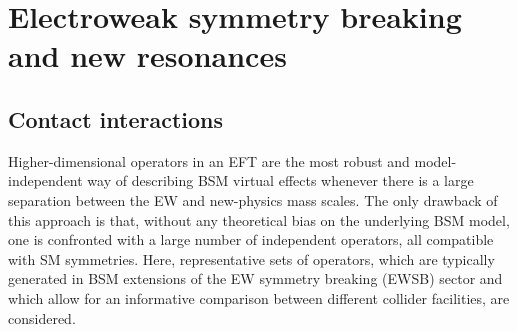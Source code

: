 \documentclass[../report.tex]{subfiles}
\begin{document}
\section{Electroweak symmetry breaking and new resonances}
\label{sec:BSM-EWKNR}

\subsection{Contact interactions}
\label{sec:contactint}

Higher-dimensional operators in an EFT are the most robust and model-independent way of describing BSM virtual effects whenever there is a large separation between the EW and new-physics mass scales. The only drawback of this approach is that, without any theoretical bias on the underlying BSM model, one is confronted with a large number of independent operators, all compatible with SM symmetries. Here, representative sets of operators, which are typically generated in BSM extensions of the EW symmetry breaking (EWSB) sector and which allow for an informative comparison between different collider facilities, are considered.
\end{document}
